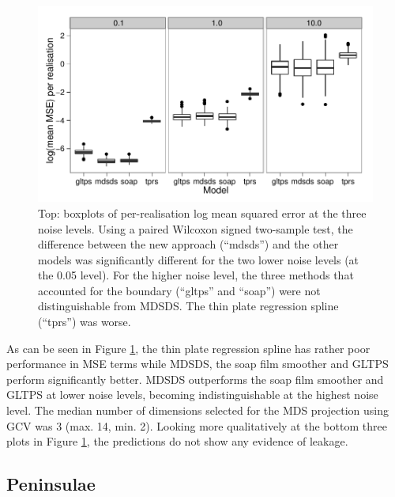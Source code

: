 \documentclass[useAMS, referee]{biom}
\begin{document}
\begin{figure}
\centering
\includegraphics[width=\textwidth]{examples/ramsay/ramsay-result.pdf}
\caption{Top: boxplots of per-realisation log mean squared error at the three noise levels. Using a paired Wilcoxon signed two-sample test, the difference between the new approach (``mdsds'') and the other models was significantly different for the two lower noise levels (at the 0.05 level). For the higher noise level, the three methods that accounted for the boundary (``gltps'' and ``soap'') were not distinguishable from MDSDS. The thin plate regression spline (``tprs'') was worse.
\label{ramsay-results}}
\end{figure}

As can be seen in Figure \ref{ramsay-results}, the thin plate regression spline has rather poor performance in MSE terms while MDSDS, the soap film smoother and GLTPS perform significantly better. MDSDS outperforms the soap film smoother and GLTPS at lower noise levels, becoming indistinguishable at the highest noise level. The median number of dimensions selected for the MDS projection using GCV was 3 (max. 14, min. 2). Looking more qualitatively at the bottom three plots in Figure \ref{ramsay-results}, the predictions do not show any evidence of leakage.


\subsection{Peninsulae}
\end{document}
